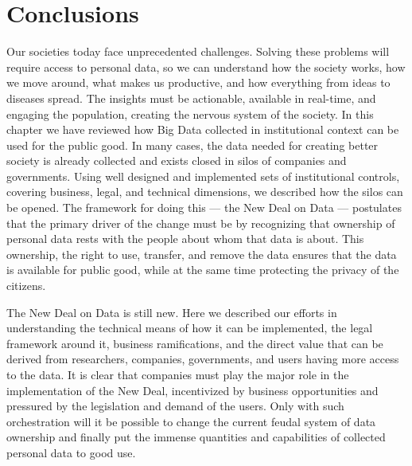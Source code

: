 \section{Conclusions}

Our societies today face unprecedented challenges.
Solving these problems will require access to personal data, so we can understand how the society works, how we move around, what makes us productive, and how everything from ideas to diseases spread.  
The insights must be actionable, available in real-time, and engaging the population, creating the nervous system of the society.
In this chapter we have reviewed how Big Data collected in institutional context can be used for the public good.
In many cases, the data needed for creating better society is already collected and exists closed in silos of companies and governments.
Using well designed and implemented sets of institutional controls, covering business, legal, and technical dimensions, we described how the silos can be opened.
The framework for doing this --- the New Deal on Data --- postulates that the primary driver of the change must be by recognizing that ownership of personal data rests with the people about whom that data is about.
This ownership, the right to use, transfer, and remove the data ensures that the data is available for public good, while at the same time protecting the privacy of the citizens.

The New Deal on Data is still new.
Here we described our efforts in understanding the technical means of how it can be implemented, the legal framework around it, business ramifications, and the direct value that can be derived from researchers, companies, governments, and users having more access to the data.
It is clear that companies must play the major role in the implementation of the New Deal, incentivized by business opportunities and pressured by the legislation and demand of the users.
Only with such orchestration will it be possible to change the current feudal system of data ownership and finally put the immense quantities and capabilities of collected personal data to good use. 
